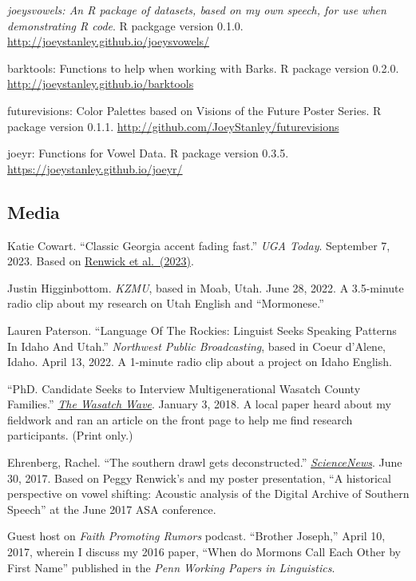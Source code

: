 \documentclass[
]{article}
\begin{document}
\emph{joeysvowels: An R package of datasets, based on my own speech, for
use when demonstrating R code}. R packgage version 0.1.0.
\url{http://joeystanley.github.io/joeysvowels/}

barktools: Functions to help when working with Barks. R package version
0.2.0. \url{http://joeystanley.github.io/barktools}

futurevisions: Color Palettes based on Visions of the Future Poster
Series. R package version 0.1.1.
\url{http://github.com/JoeyStanley/futurevisions}

joeyr: Functions for Vowel Data. R package version 0.3.5.
\url{https://joeystanley.github.io/joeyr/}

\hypertarget{media}{%
\subsection{Media}\label{media}}

Katie Cowart. ``Classic Georgia accent fading fast.'' \emph{UGA Today}.
September 7, 2023. Based on
\href{https://doi.org/10.1017/S095439452300011X}{Renwick et al.~(2023)}.

Justin Higginbottom. \emph{KZMU}, based in Moab, Utah. June 28, 2022. A
3.5-minute radio clip about my research on Utah English and
``Mormonese.''

Lauren Paterson. ``Language Of The Rockies: Linguist Seeks Speaking
Patterns In Idaho And Utah.'' \emph{Northwest Public Broadcasting},
based in Coeur d'Alene, Idaho. April 13, 2022. A 1-minute radio clip
about a project on Idaho English.

``PhD. Candidate Seeks to Interview Multigenerational Wasatch County
Families.'' \href{http://www.wasatchwave.com}{\emph{The Wasatch Wave}}.
January 3, 2018. A local paper heard about my fieldwork and ran an
article on the front page to help me find research participants. (Print
only.)

Ehrenberg, Rachel. ``The southern drawl gets deconstructed.''
\href{https://www.sciencenews.org}{\emph{ScienceNews}}. June 30, 2017.
Based on Peggy Renwick's and my poster presentation, ``A historical
perspective on vowel shifting: Acoustic analysis of the Digital Archive
of Southern Speech'' at the June 2017 ASA conference.

Guest host on \emph{Faith Promoting Rumors} podcast. ``Brother Joseph,''
April 10, 2017, wherein I discuss my 2016 paper, ``When do Mormons Call
Each Other by First Name'' published in the \emph{Penn Working Papers in
Linguistics}.
\end{document}
